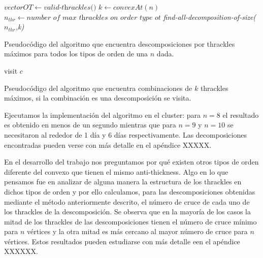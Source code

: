 \begin{algorithm}[h!]
  \begin{algorithmic}[1]
    \State $vectorOT \gets \textit{valid-thrackles()}$
    \State $k \gets convexAt(n)$
        \State $n_{thr} \gets \textit{number of max thrackles on order type ot}$
        \State \textit{find-all-decomposition-of-size($n_{thr}$,k)}
    \EndFor
    \EndProcedure
  \end{algorithmic}
  \caption{Pseudocódigo del algoritmo que encuentra descomposiciones por thrackles
  máximos para todos los tipos de orden de una $n$ dada.}
  \label{algo:maxthrackledecom}
\end{algorithm}

\begin{algorithm}[h!]
  \begin{algorithmic}[1]
        \State visit $c$
      \EndIf
    \EndWhile
    \EndProcedure
    \caption{Pseudocódigo del algoritmo que encuentra combinaciones de $k$ thrackles
    máximos, si la combinación es una descomposición se visita.}
    \label{algo:finddecompositions}
  \end{algorithmic}
\end{algorithm}

Ejecutamos la implementación del algoritmo en el cluster:
para $n=8$ el resultado es obtenido en menos de un segundo mientras que para
$n=9$ y $n=10$ se necesitaron al rededor de 1 día y 6 días respectivamente.
Las decomposiciones encontradas pueden verse con más detalle en el apéndice XXXXX.

En el desarrollo del trabajo nos preguntamos por qué existen
otros tipos de orden diferente del convexo que tienen el mismo anti-thickness.
Algo en lo que pensamos fue en analizar de alguna manera la estructura de los
thrackles en dichos tipos de orden y por ello calculamos, para las descomposiciones
obtenidas mediante el método anteriormente descrito, el número de cruce de cada
uno de los thrackles de la descomposición. Se observa que en la mayoría de los
casos la mitad de los thrackles de las descomposiciones
tienen el número de cruce mínimo para $n$ vértices y la otra mitad es más
cercano al mayor número de cruce para $n$ vértices. Estos resultados pueden
estudiarse con más detalle een el apéndice XXXXXX.

